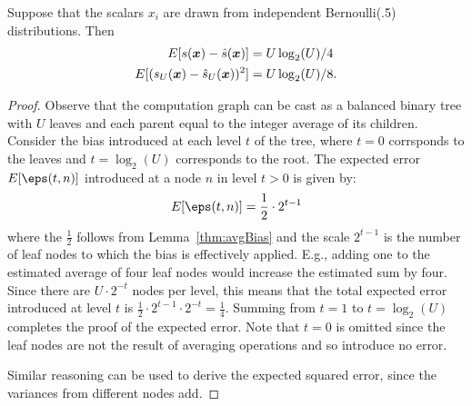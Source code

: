 


\begin{lemma} \label{thm:avgSubspace}
Suppose that the scalars $x_i$ are drawn from independent Bernoulli(.5) distributions. Then
\begin{align}
    E[s(\bm{x}) - \hat{s}(\bm{x})] &= U \log_2(U) / 4 \\
    E[(s_U(\bm{x}) - \hat{s}_U(\bm{x}))^2] &= U \log_2(U) / 8.
\end{align}
\end{lemma}
\begin{proof}
Observe that the computation graph can be cast as a balanced binary tree with $U$ leaves and each parent equal to the integer average of its children. Consider the bias introduced at each level $t$ of the tree, where $t=0$ corrsponds to the leaves and $t = \log_2(U)$ corresponds to the root. The expected error $E[\eps(t, n)]$ introduced at a node $n$ in level $t > 0$ is given by:
\begin{align}
    E[\eps(t, n)] = \frac{1}{2} \cdot 2^{t - 1}
\end{align}
where the $\frac{1}{2}$ follows from Lemma~\ref{thm:avgBias} and the scale $2^{t - 1}$ is the number of leaf nodes to which the bias is effectively applied. E.g., adding one to the estimated average of four leaf nodes would increase the estimated sum by four. Since there are $U \cdot 2^{-t}$ nodes per level, this means that the total expected error introduced at level $t$ is $\frac{1}{2} \cdot 2^{t - 1} \cdot 2^{-t} = \frac{1}{4}$. Summing from $t = 1$ to $t = \log_2(U)$ completes the proof of the expected error. Note that $t=0$ is omitted since the leaf nodes are not the result of averaging operations and so introduce no error.

Similar reasoning can be used to derive the expected squared error, since the variances from different nodes add.
\end{proof}


